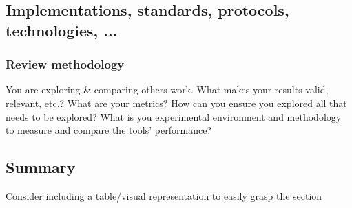 \subsection{Implementations, standards, protocols, technologies, ...}

\subsubsection{Review methodology}

You are exploring \& comparing others work. What makes your results valid, relevant, etc.? What are your metrics? How can you ensure you explored all that needs to be explored? What is you experimental environment and methodology to measure and compare the tools' performance?

\subsection{Summary}

Consider including a table/visual representation to easily grasp the section

